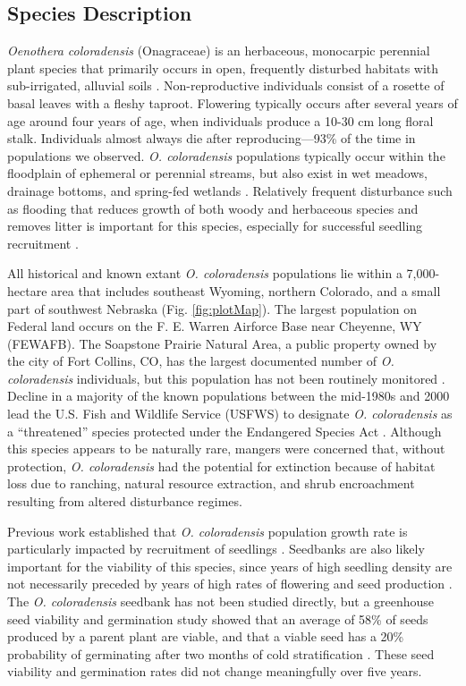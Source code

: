 \documentclass[12pt, letterpaper]{article}
\begin{document}
\subsection{Species Description}  
\textit{Oenothera coloradensis} (Onagraceae) \cite{Wagner2007RevisedOnagraceae} is an herbaceous, monocarpic perennial plant species that primarily occurs in open, frequently disturbed habitats with sub-irrigated, alluvial soils \cite{Jennings2000EndangeredNebraska}. Non-reproductive individuals consist of a rosette of basal leaves with a fleshy taproot. Flowering typically occurs after several years of age around four years of age, when individuals produce a 10-30 cm long floral stalk. Individuals almost always die after reproducing—93\% of the time in populations we observed. \textit{O. coloradensis} populations typically occur within the floodplain of ephemeral or perennial streams, but also exist in wet meadows, drainage bottoms, and spring-fed wetlands \cite{Munk1999ColoradoHerbs}. Relatively frequent disturbance such as flooding that reduces growth of both woody and herbaceous species and removes litter is important for this species, especially for successful seedling recruitment \cite{Jennings2000EndangeredNebraska, Burgess2003}. 

All historical and known extant \textit{O. coloradensis} populations lie within a 7,000-hectare area that includes southeast Wyoming, northern Colorado, and a small part of southwest Nebraska (Fig. \ref{fig:plotMap}). The largest population on Federal land occurs on the F. E. Warren Airforce Base near Cheyenne, WY (FEWAFB). The Soapstone Prairie Natural Area, a public property owned by the city of Fort Collins, CO, has the largest documented number of \textit{O. coloradensis} individuals, but this population has not been routinely monitored \cite{Jennings2000EndangeredNebraska}. Decline in a majority of the known populations between the mid-1980s and 2000 lead the U.S. Fish and Wildlife Service (USFWS) to designate \textit{O. coloradensis} as a “threatened” species protected under the Endangered Species Act \cite{Jennings2000EndangeredNebraska}. Although this species appears to be naturally rare, mangers were concerned that, without protection, \textit{O. coloradensis} had the potential for extinction because of habitat loss due to ranching, natural resource extraction, and shrub encroachment resulting from altered disturbance regimes.   

Previous work established that \textit{O. coloradensis} population growth rate is particularly impacted by recruitment of seedlings \cite{Floyd1998}. Seedbanks are also likely important for the viability of this species, since years of high seedling density are not necessarily preceded by years of high rates of flowering and seed production \cite{Munk2002RosetteSpecies}. The \textit{O. coloradensis} seedbank has not been studied directly, but a greenhouse seed viability and germination study showed that an average of 58\% of seeds produced by a parent plant are viable, and that a viable seed has a 20\% probability of germinating after two months of cold stratification \cite{Burgess2005CapsuleColoradensis}. These seed viability and germination rates did not change meaningfully over five years. 
\end{document}
